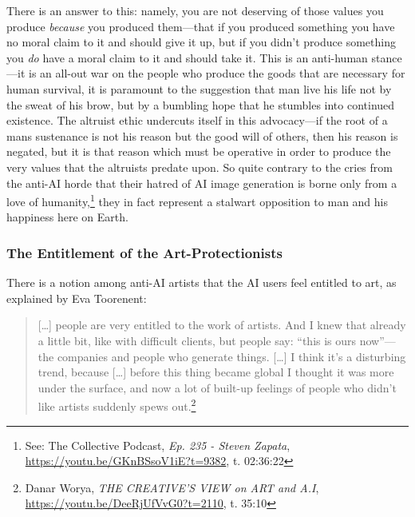 \documentclass[11pt]{article}
\begin{document}
There is an answer to this: namely, you are not deserving of those values you produce \emph{because} you produced them---that if you produced something you have no moral claim to it and should give it up, but if you didn't produce something you \emph{do} have a moral claim to it and should take it. This is an anti-human stance---it is an all-out war on the people who produce the goods that are necessary for human survival, it is paramount to the suggestion that man live his life not by the sweat of his brow, but by a bumbling hope that he stumbles into continued existence. The altruist ethic undercuts itself in this advocacy---if the root of a mans sustenance is not his reason but the good will of others, then his reason is negated, but it is that reason which must be operative in order to produce the very values that the altruists predate upon. So quite contrary to the cries from the anti-AI horde that their hatred of AI image generation is borne only from a love of humanity,\footnote{See: The Collective Podcast, \emph{Ep. 235 - Steven Zapata}, \url{https://youtu.be/GKnBSsoV1iE?t=9382}, t. 02:36:22} they in fact represent a stalwart opposition to man and his happiness here on Earth.

\subsubsection*{The Entitlement of the Art-Protectionists}
\label{sec:org60d9472}
There is a notion among anti-AI artists that the AI users feel entitled to art, as explained by Eva Toorenent:
\begin{quote}
[\ldots{}] people are very entitled to the work of artists. And I knew that already a little bit, like with difficult clients, but people say: ``this is ours now''---the companies and people who generate things. [\ldots{}] I think it's a disturbing trend, because [\ldots{}] before this thing became global I thought it was more under the surface, and now a lot of built-up feelings of people who didn't like artists suddenly spews out.\footnote{Danar Worya, \emph{THE CREATIVE'S VIEW on ART and A.I}, \url{https://youtu.be/DeeRjUfVvG0?t=2110}, t. 35:10}
\end{quote}
\end{document}
